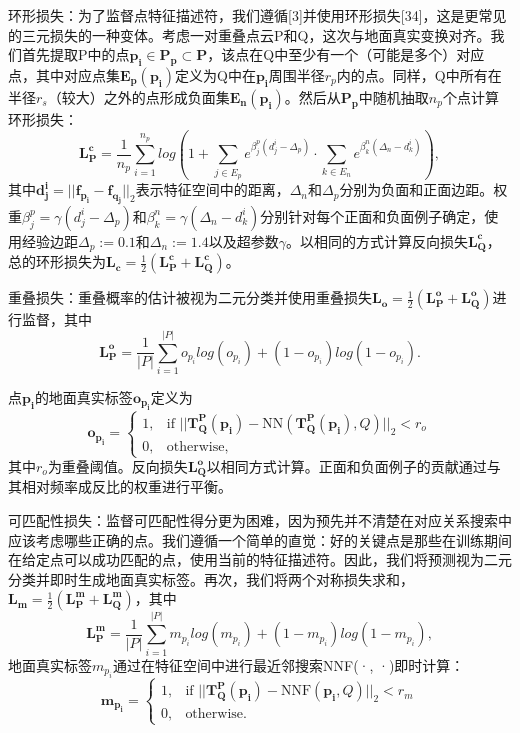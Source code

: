 环形损失：为了监督点特征描述符，我们遵循[3]并使用环形损失[34]，这是更常见的三元损失的一种变体。考虑一对重叠点云P和Q，这次与地面真实变换对齐。我们首先提取P中的点$\boldsymbol{p_i} \in \boldsymbol{P_p} \subset \boldsymbol{P}$，该点在Q中至少有一个（可能是多个）对应点，其中对应点集$\boldsymbol{E_p(p_i)}$定义为Q中在$\boldsymbol{p_i}$周围半径$r_p$内的点。同样，Q中所有在半径$r_s$（较大）之外的点形成负面集$\boldsymbol{E_n(p_i)}$。然后从$\boldsymbol{P_p}$中随机抽取$n_p$个点计算环形损失：
\begin{equation}
\boldsymbol{L_P^c} = \frac{1}{n_p} \sum_{i=1}^{n_p} log\left(1 + \sum_{j \in E_p} e^{\beta_j^p(d_j^i - \Delta_p)} \cdot \sum_{k \in E_n} e^{\beta_k^n(\Delta_n - d_k^i)}\right),
\end{equation}
其中$\boldsymbol{d_j^i} = ||\boldsymbol{f_{p_i}} - \boldsymbol{f_{q_j}}||_2$表示特征空间中的距离，$\Delta_n$和$\Delta_p$分别为负面和正面边距。权重$\beta_j^p = \gamma(d_j^i - \Delta_p)$和$\beta_k^n = \gamma(\Delta_n - d_k^i)$分别针对每个正面和负面例子确定，使用经验边距$\Delta_p := 0.1$和$\Delta_n := 1.4$以及超参数$\gamma$。以相同的方式计算反向损失$\boldsymbol{L_Q^c}$，总的环形损失为$\boldsymbol{L_c} = \frac{1}{2} (\boldsymbol{L_P^c} + \boldsymbol{L_Q^c})$。

重叠损失：重叠概率的估计被视为二元分类并使用重叠损失$\boldsymbol{L_o} = \frac{1}{2} (\boldsymbol{L_P^o} + \boldsymbol{L_Q^o})$进行监督，其中
\begin{equation}
\boldsymbol{L_P^o} = \frac{1}{|P|} \sum_{i=1}^{|P|} o_{p_i} log(o_{p_i}) + (1 - o_{p_i}) log(1 - o_{p_i}).
\end{equation}

点$\boldsymbol{p_i}$的地面真实标签$\boldsymbol{o_{p_i}}$定义为
\begin{equation}
\boldsymbol{o_{p_i}} =
\begin{cases}
1, & \text{if } ||\boldsymbol{T_{Q}^{P}(p_i)} - \text{NN}(\boldsymbol{T_{Q}^{P}(p_i)}, Q)||_2 < r_o \\
0, & \text{otherwise},
\end{cases}
\end{equation}
其中$r_o$为重叠阈值。反向损失$\boldsymbol{L_Q^o}$以相同方式计算。正面和负面例子的贡献通过与其相对频率成反比的权重进行平衡。

可匹配性损失：监督可匹配性得分更为困难，因为预先并不清楚在对应关系搜索中应该考虑哪些正确的点。我们遵循一个简单的直觉：好的关键点是那些在训练期间在给定点可以成功匹配的点，使用当前的特征描述符。因此，我们将预测视为二元分类并即时生成地面真实标签。再次，我们将两个对称损失求和，$\boldsymbol{L_m} = \frac{1}{2} (\boldsymbol{L_P^m} + \boldsymbol{L_Q^m})$，其中
\begin{equation}
\boldsymbol{L_P^m} = \frac{1}{|P|} \sum_{i=1}^{|P|} m_{p_i} log(m_{p_i}) + (1 - m_{p_i}) log(1 - m_{p_i}),
\end{equation}
地面真实标签$m_{p_i}$通过在特征空间中进行最近邻搜索NNF(·, ·)即时计算：
\begin{equation}
\boldsymbol{m_{p_i}} =
\begin{cases}
1, & \text{if } ||\boldsymbol{T_{Q}^{P}(p_i)} - \text{NNF}(\boldsymbol{p_i}, Q)||_2 < r_m \\
0, & \text{otherwise}.
\end{cases}
\end{equation}

